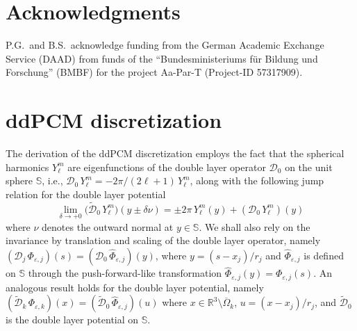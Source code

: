 \documentclass[aip,jcp,a4paper,11pt]{revtex4-1}
\newcommand{\cD}{\mathcal{D}}
\begin{document}
\section*{Acknowledgments}
P.G.~and B.S.~acknowledge funding from the German Academic Exchange Service (DAAD) from funds of the ``Bundesministeriums f\"ur Bildung und Forschung'' (BMBF) for the project Aa-Par-T (Project-ID 57317909).
\appendix

\section{ddPCM discretization\label{app:pcm}}
The derivation of the ddPCM discretization employs the fact that the spherical harmonics $Y_\ell^m$ are eigenfunctions of the double layer operator $\cD_{0}$ on the unit sphere $\mathbb{S}$, i.e., $\cD_0 \, Y_\ell^m =  -2\pi/ (2\ell+1) \,  Y_\ell^m$, along with the following jump relation for the double layer potential
\begin{equation}\label{eq:jump}
	\lim_{\delta \to + 0} \big(\tilde{\cD}_0 \, Y_\ell^m\big)(y \pm \delta \nu) =  \pm 2\pi \, Y_\ell^m(y)+ ( \cD_0 \, Y_\ell^m )(y)
\end{equation}
where $\nu$ denotes the outward normal at $y \in \mathbb{S}$. We shall also rely on the invariance by translation and scaling of the double layer operator, namely  $(\mathcal{D}_j \, \Phi_{\varepsilon,j})(s) = (\mathcal{D}_0 \, \hat{\Phi}_{\varepsilon,j})(y)$, where $y = (s - x_j)/r_j$ and $\hat{\Phi}_{\varepsilon,j}$ is defined on $\mathbb{S}$ through the push-forward-like transformation $\hat{\Phi}_{\varepsilon,j}(y) = \Phi_{\varepsilon,j}(s)$. An analogous result holds for the double layer potential, namely $(\tilde{\cD}_k \, \Phi_{\varepsilon,k} )(x) = (\tilde{\cD}_0 \, \hat{\Phi}_{\varepsilon,j})(u)$ where $x \in \mathbb{R}^3 \setminus \overline{\Omega}_k$, $u = (x -x_j)/ r_j$, and $\tilde{\cD}_0$ is the double layer potential on $\mathbb{S}$.
\end{document}
